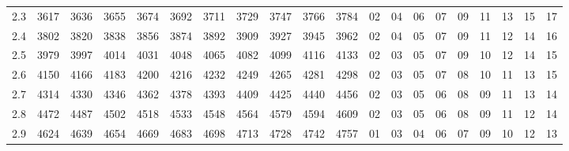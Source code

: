 \documentclass[12pt,UTF8]{ctexbook}
\begin{document}
\begin{appendix}
\begin{longtable}{|c| c c c c c | c c c c c| c c c c c c c c c|}
\scriptsize 2.3 & \scriptsize 3617 & \scriptsize 3636 & \scriptsize 3655 & \scriptsize 3674 & \scriptsize 3692 & \scriptsize 3711 & \scriptsize 3729 & \scriptsize 3747 & \scriptsize 3766 & \scriptsize 3784 & \scriptsize 02 & \scriptsize 04 & \scriptsize 06 & \scriptsize 07 & \scriptsize 09 & \scriptsize 11 & \scriptsize 13 & \scriptsize 15 & \scriptsize 17 \\
\scriptsize 2.4 & \scriptsize 3802 & \scriptsize 3820 & \scriptsize 3838 & \scriptsize 3856 & \scriptsize 3874 & \scriptsize 3892 & \scriptsize 3909 & \scriptsize 3927 & \scriptsize 3945 & \scriptsize 3962 & \scriptsize 02 & \scriptsize 04 & \scriptsize 05 & \scriptsize 07 & \scriptsize 09 & \scriptsize 11 & \scriptsize 12 & \scriptsize 14 & \scriptsize 16 \\
\scriptsize 2.5 & \scriptsize 3979 & \scriptsize 3997 & \scriptsize 4014 & \scriptsize 4031 & \scriptsize 4048 & \scriptsize 4065 & \scriptsize 4082 & \scriptsize 4099 & \scriptsize 4116 & \scriptsize 4133 & \scriptsize 02 & \scriptsize 03 & \scriptsize 05 & \scriptsize 07 & \scriptsize 09 & \scriptsize 10 & \scriptsize 12 & \scriptsize 14 & \scriptsize 15 \\
\scriptsize 2.6 & \scriptsize 4150 & \scriptsize 4166 & \scriptsize 4183 & \scriptsize 4200 & \scriptsize 4216 & \scriptsize 4232 & \scriptsize 4249 & \scriptsize 4265 & \scriptsize 4281 & \scriptsize 4298 & \scriptsize 02 & \scriptsize 03 & \scriptsize 05 & \scriptsize 07 & \scriptsize 08 & \scriptsize 10 & \scriptsize 11 & \scriptsize 13 & \scriptsize 15 \\
\scriptsize 2.7 & \scriptsize 4314 & \scriptsize 4330 & \scriptsize 4346 & \scriptsize 4362 & \scriptsize 4378 & \scriptsize 4393 & \scriptsize 4409 & \scriptsize 4425 & \scriptsize 4440 & \scriptsize 4456 & \scriptsize 02 & \scriptsize 03 & \scriptsize 05 & \scriptsize 06 & \scriptsize 08 & \scriptsize 09 & \scriptsize 11 & \scriptsize 13 & \scriptsize 14 \\
\scriptsize 2.8 & \scriptsize 4472 & \scriptsize 4487 & \scriptsize 4502 & \scriptsize 4518 & \scriptsize 4533 & \scriptsize 4548 & \scriptsize 4564 & \scriptsize 4579 & \scriptsize 4594 & \scriptsize 4609 & \scriptsize 02 & \scriptsize 03 & \scriptsize 05 & \scriptsize 06 & \scriptsize 08 & \scriptsize 09 & \scriptsize 11 & \scriptsize 12 & \scriptsize 14 \\
\scriptsize 2.9 & \scriptsize 4624 & \scriptsize 4639 & \scriptsize 4654 & \scriptsize 4669 & \scriptsize 4683 & \scriptsize 4698 & \scriptsize 4713 & \scriptsize 4728 & \scriptsize 4742 & \scriptsize 4757 & \scriptsize 01 & \scriptsize 03 & \scriptsize 04 & \scriptsize 06 & \scriptsize 07 & \scriptsize 09 & \scriptsize 10 & \scriptsize 12 & \scriptsize 13 \\

\end{longtable}
\end{appendix}
\end{document}
